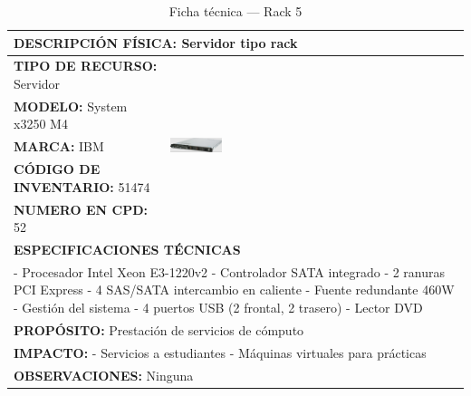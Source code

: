 \begin{table}[H]
\centering
\scriptsize
\setlength{\tabcolsep}{2pt}
\renewcommand{\arraystretch}{1.0}
\caption{Ficha técnica --- Rack 5}\label{tab:rack-5}
\begin{tabular}{|p{}|p{}|}
\hline
\multicolumn{2}{|l|}{\textbf{DESCRIPCIÓN FÍSICA:} Servidor tipo rack} \\ \hline
\textbf{TIPO DE RECURSO:} Servidor & 
\multirow{5}{*}{\includegraphics[width=0.18\textwidth,keepaspectratio]{tablas-images/cp1/racks/rack-1.png}} \\ \cline{1-1}
\textbf{MODELO:} System x3250 M4 & \\ \cline{1-1}
\textbf{MARCA:} IBM & \\ \cline{1-1}
\textbf{CÓDIGO DE INVENTARIO:} 51474 & \\ \cline{1-1}
\textbf{NUMERO EN CPD:} 52 & \\ \hline
\multicolumn{2}{|l|}{\textbf{ESPECIFICACIONES TÉCNICAS}} \\ \hline
\multicolumn{2}{|p{0.7\textwidth}|}{
- Procesador Intel Xeon E3-1220v2
- Controlador SATA integrado
- 2 ranuras PCI Express
- 4 SAS/SATA intercambio en caliente
- Fuente redundante 460W
- Gestión del sistema
- 4 puertos USB (2 frontal, 2 trasero)
- Lector DVD
} \\ \hline
\multicolumn{2}{|l|}{\textbf{PROPÓSITO:} Prestación de servicios de cómputo} \\ \hline
\multicolumn{2}{|p{0.7\textwidth}|}{\textbf{IMPACTO:} 
- Servicios a estudiantes
- Máquinas virtuales para prácticas} \\ \hline
\multicolumn{2}{|p{0.7\textwidth}|}{\textbf{OBSERVACIONES:} Ninguna} \\ \hline
\end{tabular}
\end{table}

